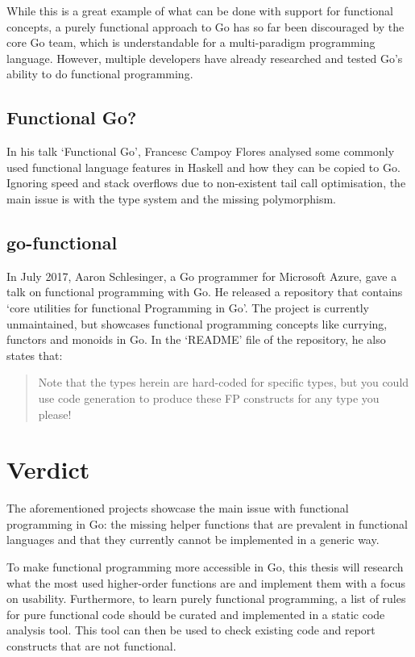 While this is a great example of what can be done with support for functional concepts, a purely functional approach to
Go has so far been discouraged by the core Go team, which is understandable for a multi-paradigm programming language.
However, multiple developers have already researched and tested Go's ability to do functional programming.

\subsection{Functional Go?}

In his talk `Functional Go'\autocite{func-go-talk}, Francesc Campoy Flores analysed some commonly used functional
language features in Haskell and how they can be copied to Go. Ignoring speed and stack overflows due to non-existent
tail call optimisation\autocite{go-tco}, the main issue is with the type system and the missing polymorphism.

\subsection{go-functional}

In July 2017, Aaron Schlesinger, a Go programmer for Microsoft Azure, gave a talk on functional programming with Go.
He released a repository\autocite{go-functional} that contains `core utilities for functional Programming in Go'.
The project is currently unmaintained, but showcases functional programming concepts like currying, functors and
monoids in Go. In the `README' file of the repository, he also states that:
\begin{quote}
    Note that the types herein are hard-coded for specific types, but you could
    use code generation to produce these FP constructs for any type you please!
    \autocite{go-functional-readme}
\end{quote}

\section{Verdict}

The aforementioned projects showcase the main issue with functional programming in Go: the missing
helper functions that are prevalent in functional languages and that they currently cannot be implemented
in a generic way.

To make functional programming more accessible in Go, this thesis will research what the most used
higher-order functions are and implement them with a focus on usability.
Furthermore, to learn purely functional programming, a list of rules for pure functional code should
be curated and implemented in a static code analysis tool. This tool can then be used to check
existing code and report constructs that are not functional.
